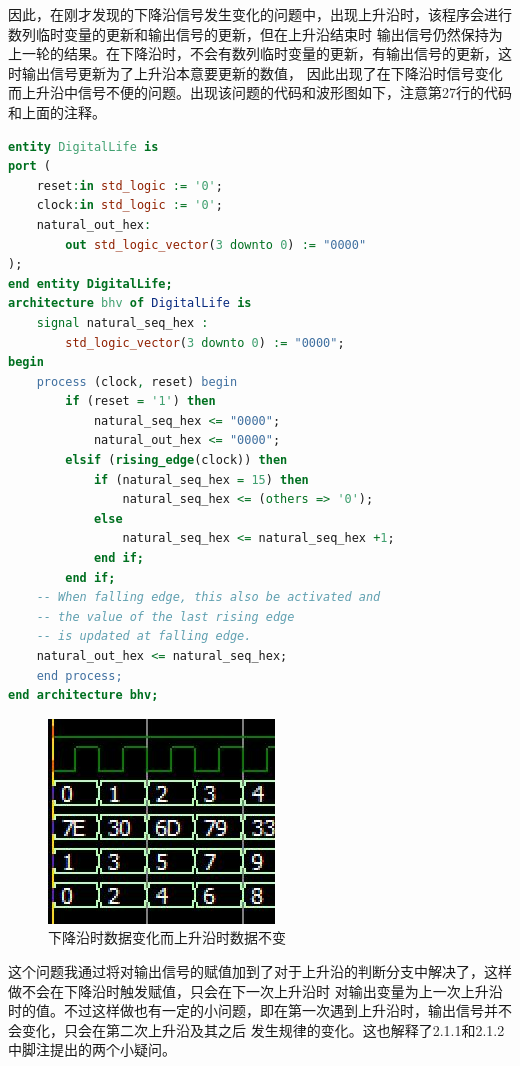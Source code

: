 \documentclass[UTF8]{article}
\begin{document}
\qquad 因此，在刚才发现的下降沿信号发生变化的问题中，出现上升沿时，该程序会进行数列临时变量的更新和输出信号的更新，但在上升沿结束时
输出信号仍然保持为上一轮的结果。在下降沿时，不会有数列临时变量的更新，有输出信号的更新，这时输出信号更新为了上升沿本意要更新的数值，
因此出现了在下降沿时信号变化而上升沿中信号不便的问题。出现该问题的代码和波形图如下，注意第27行的代码和上面的注释。

\begin{lstlisting}[language={vhdl}]
entity DigitalLife is
port (
    reset:in std_logic := '0';  
    clock:in std_logic := '0';  
    natural_out_hex: 
        out std_logic_vector(3 downto 0) := "0000"
);
end entity DigitalLife;
architecture bhv of DigitalLife is
    signal natural_seq_hex :
        std_logic_vector(3 downto 0) := "0000";
begin
    process (clock, reset) begin
        if (reset = '1') then
            natural_seq_hex <= "0000";
            natural_out_hex <= "0000";
        elsif (rising_edge(clock)) then
            if (natural_seq_hex = 15) then
                natural_seq_hex <= (others => '0'); 
            else
                natural_seq_hex <= natural_seq_hex +1;
            end if;
        end if;
    -- When falling edge, this also be activated and
    -- the value of the last rising edge
    -- is updated at falling edge.
    natural_out_hex <= natural_seq_hex;
    end process;
end architecture bhv;

\end{lstlisting}

\begin{figure}[h]
    \centering
    \includegraphics[]{fallingEdgeUpdate.jpg}
    \caption{下降沿时数据变化而上升沿时数据不变}
\end{figure}
\qquad 这个问题我通过将对输出信号的赋值加到了对于上升沿的判断分支中解决了，这样做不会在下降沿时触发赋值，只会在下一次上升沿时
对输出变量为上一次上升沿时的值。不过这样做也有一定的小问题，即在第一次遇到上升沿时，输出信号并不会变化，只会在第二次上升沿及其之后
发生规律的变化。这也解释了2.1.1和2.1.2中脚注提出的两个小疑问。
\end{document}
